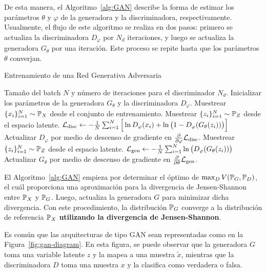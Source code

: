 De esta manera, el Algoritmo~\ref*{alg:GAN} describe la forma de estimar los parámetros $\theta$ y $\varphi$ de la generadora y la discriminadora, respectivamente. Usualmente, el flujo de este algoritmo se realiza en dos pasos: primero se actualiza la discriminadora $D_\varphi$ por $N_d$ iteraciones, y luego se actualiza la generadora $G_\theta$ por una iteración. Este proceso se repite hasta que los parámetros $\theta$ converjan.

\begin{algorithm}[H]
    \caption{Entrenamiento de una Red Generativa Adversaria}\label{alg:GAN}
    \begin{algorithmic}[1]
        \Require Tamaño del batch $N$ y número de iteraciones para el discriminador $N_d$.
        \State Inicializar los parámetros de la generadora $G_\theta$ y la discriminadora $D_\varphi$.
        \State Muestrear $\{x_i\}_{i=1}^{N} \sim \Prob_X$ desde el conjunto de entrenamiento.
        \State Muestrear $\{z_i\}_{i=1}^{N} \sim \Prob_Z$ desde el espacio latente.
        \State $\cL_{\mathrm{disc}} \gets -\frac{1}{N}\sum_{i=1}^{N} \Big[ \ln D_\varphi(x_i) + \ln \qty\big(1 - D_\varphi(G_\theta(z_i))) \Big]$
        \State Actualizar $D_\varphi$ por medio de descenso de gradiente en $\pdv{\varphi} \cL_{\mathrm{disc}}$.
        \EndFor
        \State Muestrear $\{z_i\}_{i=1}^{N} \sim \Prob_Z$ desde el espacio latente.
        \State $\cL_{\mathrm{gen}} \gets - \frac{1}{N}\sum_{i=1}^{N} \ln \qty\big(D_\varphi(G_\theta(z_i)))$
        \State Actualizar $G_\theta$ por medio de descenso de gradiente en $\pdv{\theta} \mathcal{L}_{\mathrm{gen}}$.
        \EndWhile
    \end{algorithmic}
\end{algorithm}

\begin{remark}
    El Algoritmo~\ref{alg:GAN} empieza por determinar el óptimo de $\max_D V( \Prob_G , \Prob_D )$, el cuál proporciona una aproximación para la divergencia de Jensen-Shannon entre $\Prob_X$ y $\Prob_G$. Luego, actualiza la generadora $G$ para minimizar dicha divergencia. Con este procedimiento, la distribución $\Prob_G$ converge a la distribución de referencia $\Prob_X$ \textbf{utilizando la divergencia de Jensen-Shannon}.
\end{remark}

Es común que las arquitecturas de tipo GAN sean representadas como en la Figura~\ref{fig:gan-diagram}. En esta figura, se puede observar que la generadora $G$ toma una variable latente $z$ y la mapea a una muestra $\tilde x$, mientras que la discriminadora $D$ toma una muestra $x$ y la clasifica como verdadera o falsa.

